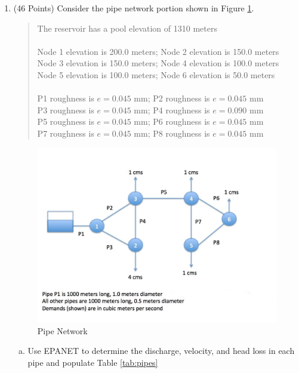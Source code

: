\documentclass[12pt]{article}
\begin{document}
\begin{enumerate}

\item \label{prob:EPANET} (46 Points) Consider the pipe network portion shown in Figure \ref{fig:Pipes}.
\begin{quote}
The reservoir has a pool elevation of 1310 meters\\
\\
Node 1 elevation is 200.0 meters; Node 2 elevation is 150.0 meters\\
Node 3 elevation is 150.0 meters; Node 4 elevation is 100.0 meters\\
Node 5 elevation is 100.0 meters; Node 6 elevation is 50.0 meters\\
\\
P1 roughness is $e=0.045$ mm; P2  roughness is $e=0.045$ mm\\
P3 roughness is $e=0.045$ mm; P4  roughness is $e=0.090$ mm\\
P5 roughness is $e=0.045$ mm; P6  roughness is $e=0.045$ mm\\
P7 roughness is $e=0.045$ mm; P8  roughness is $e=0.045$ mm\\

\end{quote}
\begin{figure}[h!] %
\centering
   \includegraphics[width=6.5in]{2018Pipeline.jpg}
   \caption{Pipe Network}
   \label{fig:Pipes} 
\end{figure}
\clearpage

\begin{enumerate}[a)]
\item Use EPANET to determine the discharge, velocity, and head loss in each pipe and populate Table \ref{tab:pipes}


\end{enumerate}
\end{enumerate}
\end{document}
